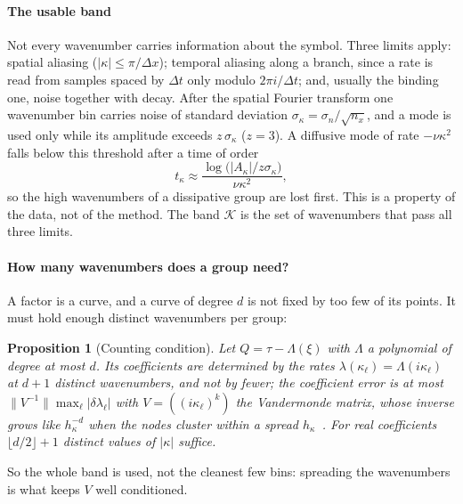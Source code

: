 \documentclass[11pt]{article}
\theoremstyle{plain}
\newtheorem{proposition}[theorem]{Proposition}
\theoremstyle{definition}
\theoremstyle{remark}
\newcommand{\noise}{\sigma_{n}}             %
\newcommand{\sigbin}{\sigma_{\kappa}}       %
\newcommand{\abs}[1]{\lvert#1\rvert}
\newcommand{\norm}[1]{\lVert#1\rVert}
\begin{document}
\paragraph{The usable band} Not every wavenumber carries information about the symbol. Three limits apply: spatial
aliasing ($\abs{\kappa}\le\pi/\Delta x$); temporal aliasing along a branch, since a rate is read from samples spaced by
$\Delta t$ only modulo $2\pi i/\Delta t$; and, usually the binding one, noise together with decay. After the spatial Fourier
transform one wavenumber bin carries noise of standard deviation $\sigbin=\noise/\sqrt{n_x}$, and a mode is used only
while its amplitude exceeds $z\,\sigbin$ ($z=3$). A diffusive mode of rate $-\nu\kappa^2$ falls below this threshold after
a time of order
\[
  t_\kappa\approx\frac{\log\big(\abs{A_\kappa}/z\sigbin\big)}{\nu\kappa^2},
\]
so the high wavenumbers of a dissipative group are lost
first. This is a property of the data, not of the method. The band $\mathcal K$ is the set of wavenumbers that pass all
three limits. 

\paragraph{How many wavenumbers does a group need?} A factor is a curve, and a curve of degree $d$ is not fixed by too
few of its points. It must hold enough distinct wavenumbers per group:

\begin{proposition}[Counting condition]\label{prop:counting}
Let $Q=\tau-\Lambda(\xi)$ with $\Lambda$ a polynomial of degree at most $d$. Its coefficients are determined by the rates
$\lambda(\kappa_\ell)=\Lambda(i\kappa_\ell)$ at $d+1$ distinct wavenumbers, and not by fewer; the coefficient error is at
most $\norm{V^{-1}}\max_\ell\abs{\delta\lambda_\ell}$ with $V=((i\kappa_\ell)^k)$ the Vandermonde matrix, whose inverse grows
like $h_\kappa^{-d}$ when the nodes cluster within a spread $h_\kappa$~\cite{Gau62}. For real coefficients
$\lfloor d/2\rfloor+1$ distinct values of $\abs{\kappa}$ suffice.
\end{proposition}

So the whole band is used, not the cleanest few bins: spreading the wavenumbers is what keeps $V$ well conditioned.
\end{document}
